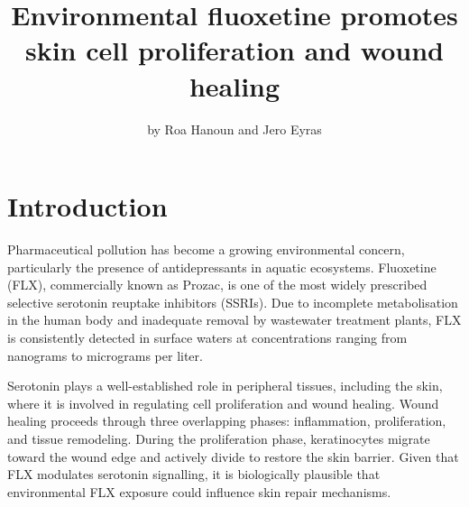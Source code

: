 \title{Environmental fluoxetine promotes skin cell proliferation and
wound healing}
\author{by Roa Hanoun and Jero Eyras}

\maketitle


\section{Introduction}\label{introduction}

Pharmaceutical pollution has become a growing environmental concern,
particularly the presence of antidepressants in aquatic ecosystems.
Fluoxetine (FLX), commercially known as Prozac, is one of the most
widely prescribed selective serotonin reuptake inhibitors (SSRIs). Due
to incomplete metabolisation in the human body and inadequate removal by
wastewater treatment plants, FLX is consistently detected in surface
waters at concentrations ranging from nanograms to micrograms per liter.

Serotonin plays a well-established role in peripheral tissues, including
the skin, where it is involved in regulating cell proliferation and
wound healing. Wound healing proceeds through three overlapping phases:
inflammation, proliferation, and tissue remodeling. During the
proliferation phase, keratinocytes migrate toward the wound edge and
actively divide to restore the skin barrier. Given that FLX modulates
serotonin signalling, it is biologically plausible that environmental
FLX exposure could influence skin repair mechanisms.

